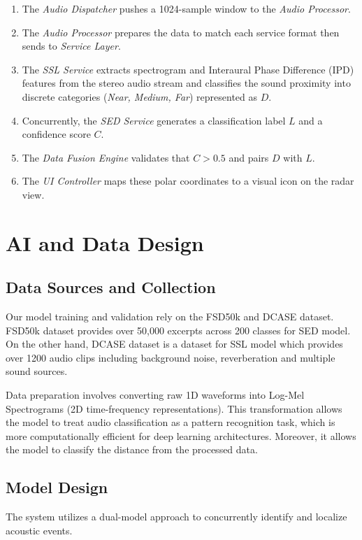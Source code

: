 \begin{enumerate}
    \item The \textit{Audio Dispatcher} pushes a 1024-sample window to the \textit{Audio Processor}.
    \item The \textit{Audio Processor} prepares the data to match each service format then sends to \textit{Service Layer}.
    \item The \textit{SSL Service} extracts spectrogram and Interaural Phase Difference (IPD) features from the stereo audio stream and classifies the sound proximity into discrete categories (\textit{Near, Medium, Far}) represented as $D$.
    \item Concurrently, the \textit{SED Service} generates a classification label $L$ and a confidence score $C$.
    \item The \textit{Data Fusion Engine} validates that $C > 0.5$ and pairs $D$ with $L$.
    \item The \textit{UI Controller} maps these polar coordinates to a visual icon on the radar view.
\end{enumerate}

\section{AI and Data Design}
\label{section:ai-data-design}

\subsection{Data Sources and Collection}
Our model training and validation rely on the FSD50k and DCASE dataset. 
FSD50k dataset provides over 50,000 excerpts across 200 classes for SED model. 
On the other hand, DCASE dataset is a dataset for SSL model which provides over 1200 audio clips including background noise, reverberation and multiple sound sources.

Data preparation involves converting raw 1D waveforms into Log-Mel Spectrograms (2D time-frequency representations). 
This transformation allows the model to treat audio classification as a pattern recognition task, which is more computationally efficient for deep learning architectures.
Moreover, it allows the model to classify the distance from the processed data.

\subsection{Model Design}
The system utilizes a dual-model approach to concurrently identify and localize acoustic events.

